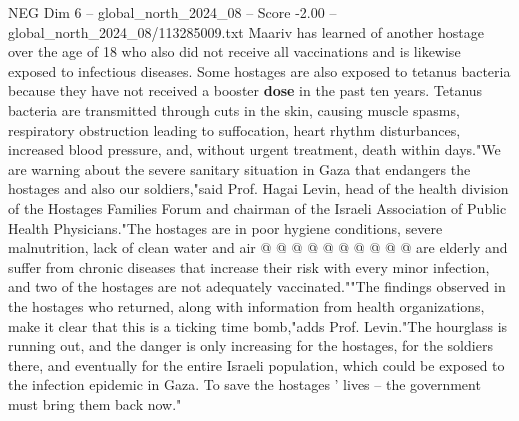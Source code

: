 \begin{textsample}{NEG Dim 6 – global\_north\_2024\_08 – Score -2.00 – global\_north\_2024\_08/113285009.txt}
Maariv has learned of another hostage over the age of 18 who also did not receive all vaccinations and is likewise exposed to infectious diseases.
Some hostages are also exposed to tetanus bacteria because they have not received a booster \textbf{dose} in the past ten years.
Tetanus bacteria are transmitted through cuts in the skin, causing muscle spasms, respiratory obstruction leading to suffocation, heart rhythm disturbances, increased blood pressure, and, without urgent treatment, death within days."We are warning about the severe sanitary situation in Gaza that endangers the hostages and also our soldiers,"said Prof.
Hagai Levin, head of the health division of the Hostages Families Forum and chairman of the Israeli Association of Public Health Physicians."The hostages are in poor hygiene conditions, severe malnutrition, lack of clean water and air @ @ @ @ @ @ @ @ @ @ are elderly and suffer from chronic diseases that increase their risk with every minor infection, and two of the hostages are not adequately vaccinated.""The findings observed in the hostages who returned, along with information from health organizations, make it clear that this is a ticking time bomb,"adds Prof.
Levin."The hourglass is running out, and the danger is only increasing for the hostages, for the soldiers there, and eventually for the entire Israeli population, which could be exposed to the infection epidemic in Gaza.
To save the hostages ' lives -- the government must bring them back now."

\end{textsample}
